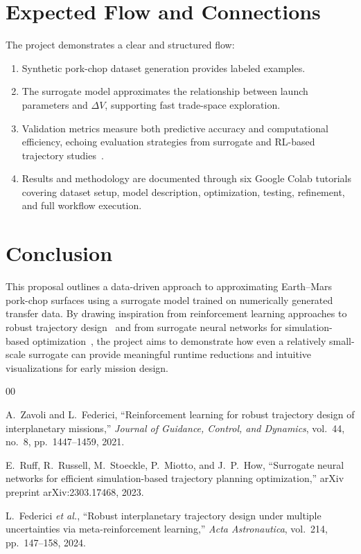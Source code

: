 \documentclass[conference]{IEEEtran}
\begin{document}
	\section{Expected Flow and Connections}
	The project demonstrates a clear and structured flow:
	\begin{enumerate}
		\item Synthetic pork-chop dataset generation provides labeled examples.
		\item The surrogate model approximates the relationship between launch parameters and $\Delta V$, supporting fast trade-space exploration.
		\item Validation metrics measure both predictive accuracy and computational efficiency, echoing evaluation strategies from surrogate and RL-based trajectory studies~\cite{zavoli2021reinforcement,federici2024robust,ruff2023surrogate}.
		\item Results and methodology are documented through six Google Colab tutorials covering dataset setup, model description, optimization, testing, refinement, and full workflow execution.
	\end{enumerate}
	
	\section{Conclusion}
	This proposal outlines a data-driven approach to approximating Earth--Mars pork-chop surfaces using a surrogate model trained on numerically generated transfer data. By drawing inspiration from reinforcement learning approaches to robust trajectory design~\cite{zavoli2021reinforcement,federici2024robust} and from surrogate neural networks for simulation-based optimization~\cite{ruff2023surrogate}, the project aims to demonstrate how even a relatively small-scale surrogate can provide meaningful runtime reductions and intuitive visualizations for early mission design.
	
	\begin{thebibliography}{00}
		
		A.~Zavoli and L.~Federici, ``Reinforcement learning for robust trajectory design of interplanetary missions,'' \textit{Journal of Guidance, Control, and Dynamics}, vol.~44, no.~8, pp.~1447--1459, 2021.
		
		E.~Ruff, R.~Russell, M.~Stoeckle, P.~Miotto, and J.~P.~How, ``Surrogate neural networks for efficient simulation-based trajectory planning optimization,'' arXiv preprint arXiv:2303.17468, 2023.
		
		L.~Federici \textit{et al.}, ``Robust interplanetary trajectory design under multiple uncertainties via meta-reinforcement learning,'' \textit{Acta Astronautica}, vol.~214, pp.~147--158, 2024.
		
	\end{thebibliography}
	
\end{document}
